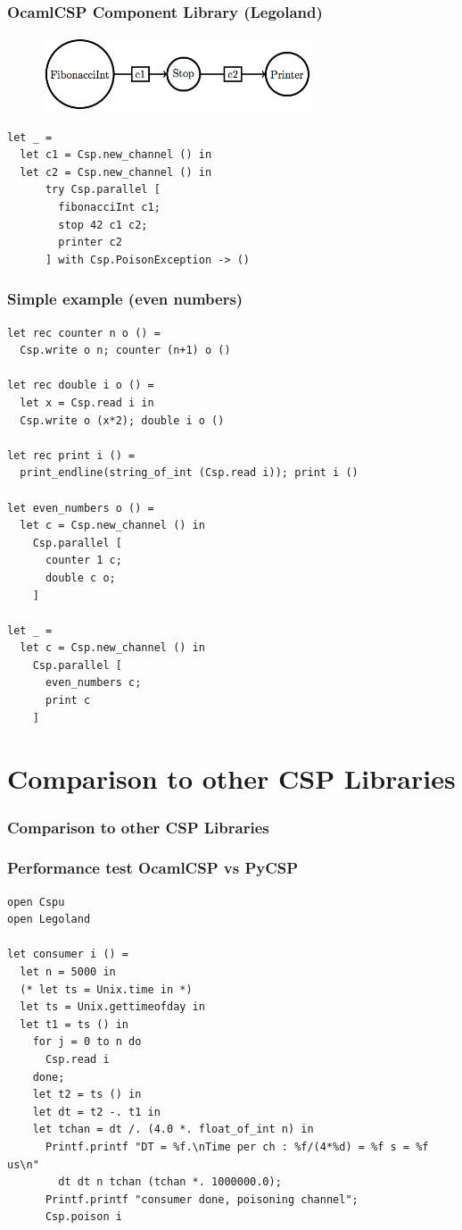 \documentclass{beamer}
\begin{document}
\begin{frame}[fragile]
  \frametitle{OcamlCSP Component Library (Legoland)}
  \begin{figure}[htp]
    \begin{center}
      \includegraphics[width=8cm,keepaspectratio=true]{figures/fib2.png}
    \end{center}
  \end{figure}
\tiny
\begin{verbatim}
let _ = 
  let c1 = Csp.new_channel () in
  let c2 = Csp.new_channel () in
      try Csp.parallel [
        fibonacciInt c1;
        stop 42 c1 c2;
        printer c2
      ] with Csp.PoisonException -> ()
\end{verbatim}
\normalsize
\end{frame}

\begin{frame}[fragile]
  \frametitle{Simple example (even numbers)}
  \tiny
\begin{verbatim}
let rec counter n o () =
  Csp.write o n; counter (n+1) o ()

let rec double i o () =
  let x = Csp.read i in
  Csp.write o (x*2); double i o ()

let rec print i () =
  print_endline(string_of_int (Csp.read i)); print i ()

let even_numbers o () =
  let c = Csp.new_channel () in
    Csp.parallel [
      counter 1 c;
      double c o;
    ]

let _ =
  let c = Csp.new_channel () in
    Csp.parallel [
      even_numbers c;
      print c
    ]
\end{verbatim}
  \normalsize
\end{frame}


\section[Comparsion]{Comparison to other CSP Libraries}
\begin{frame}
  \frametitle{Comparison to other CSP Libraries}
\end{frame}

\begin{frame}[fragile]
  \frametitle{Performance test OcamlCSP vs PyCSP}
  \tiny
\begin{verbatim}
open Cspu
open Legoland

let consumer i () =
  let n = 5000 in
  (* let ts = Unix.time in *)
  let ts = Unix.gettimeofday in
  let t1 = ts () in
    for j = 0 to n do
      Csp.read i
    done;
    let t2 = ts () in
    let dt = t2 -. t1 in
    let tchan = dt /. (4.0 *. float_of_int n) in
      Printf.printf "DT = %f.\nTime per ch : %f/(4*%d) = %f s = %f us\n"
        dt dt n tchan (tchan *. 1000000.0);
      Printf.printf "consumer done, poisoning channel";
      Csp.poison i
\end{verbatim}
  \normalsize
\end{frame}
\end{document}
